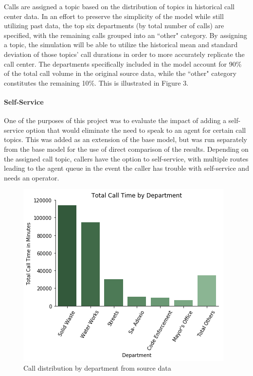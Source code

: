 \documentclass[12pt,twocolumn]{article}
\begin{document}
Calls are assigned a topic based on the distribution of topics in historical call center data.  In an effort to preserve the simplicity of the model while still utilizing past data, the top six departments (by total number of calls) are specified, with the remaining calls grouped into an ``other" category.  By assigning a topic, the simulation will be able to utilize the historical mean and standard deviation of those topics' call durations in order to more accurately replicate the call center.  The departments specifically included in the model account for 90\% of the total call volume in the original source data, while the ``other" category constitutes the remaining 10\%.  This is illustrated in Figure 3.

	\paragraph{Self-Service}
	
One of the purposes of this project was to evaluate the impact of adding a self-service option that would eliminate the need to speak to an agent for certain call topics.  This was added as an extension of the base model, but was run separately from the base model for the use of direct comparison of the results.  Depending on the assigned call topic, callers have the option to self-service, with multiple routes leading to the agent queue in the event the caller has trouble with self-service and needs an operator.


\begin{figure}[h]
	\includegraphics[scale=.53]{Calls_Department_sim.png}
	\caption{Call distribution by department from source data}
\end{figure}
\end{document}
